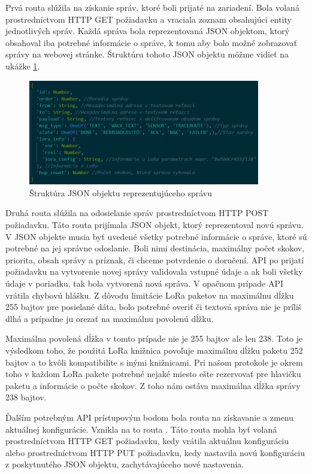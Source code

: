 \documentclass[slovak,master]{diploma}
\begin{document}
Prvá routa slúžila na získanie správ, ktoré boli prijaté na zariadení. Bola volaná prostredníctvom HTTP GET požiadavku a 
vraciala zoznam obsahujúci entity jednotlivých správ. Každá správa bola reprezentovaná JSON objektom, ktorý obsahoval 
iba potrebné informácie o správe, k tomu aby bolo možné zobrazovať správy na webovej stránke. Štruktúru tohoto JSON 
objektu môžme vidieť na ukážke \ref{fig:messageObj}.

\begin{figure}[h!]
	\centering
	\includegraphics[width=0.9\textwidth]{Figures/msgObject.png}
	\caption{Štruktúra JSON objektu reprezentujúceho správu}
	\label{fig:messageObj}
\end{figure}

Druhá routa slúžila na odosielanie správ prostredníctvom HTTP POST požiadavku. Táto routa prijímala JSON objekt, ktorý reprezentoval novú správu.
V JSON objekte musia byť uvedené všetky potrebné informácie o správe, ktoré sú potrebné na jej správne odoslanie. 
Boli nimi destinácia, maximálny počet skokov, priorita, obsah správy a príznak, či chceme potvrdenie o doručení. 
API po prijatí požiadavku na vytvorenie novej správy validovala vstupné údaje a ak boli všetky údaje v poriadku, tak bola vytvorená nová správa. V 
opačnom prípade API vrátila chybovú hlášku. Z dôvodu limitácie LoRa paketov na maximálnu dĺžku 255 bajtov pre posielané dáta, bolo potrebné overiť či textová správa 
nie je príliš dlhá a prípadne ju orezať na maximálnu povolenú dĺžku.

Maximálna povolená dĺžka v tomto prípade nie je 255 bajtov ale len 238. Toto je výsledkom toho, 
že použitá LoRa knižnica povoľuje maximálnu dĺžku paketu 252 bajtov a to kvôli kompatibilite s inými knižnicami.
Pri našom protokole je okrem toho v každom LoRa pakete potrebné nejaké miesto ešte rezervovať pre hlavičku paketu a informácie o počte skokov.
Z toho nám ostáva maximálna dĺžka správy 238 bajtov.

Ďalším potrebným API prístupovým bodom bola routa na získavanie a zmenu aktuálnej konfigurácie. 
Vznikla na to routa . Táto routa mohla byť volaná prostredníctvom HTTP GET požiadavku, kedy vrátila aktuálnu konfiguráciu 
alebo prostredníctvom HTTP PUT požiadavku, kedy nastavila novú konfiguráciu z poskytnutého JSON objektu, zachytávajúceho nové nastavenia.
\end{document}
